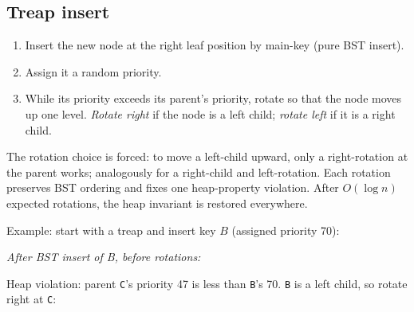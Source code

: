 \documentclass[11pt]{article}
\begin{document}
\subsection*{Treap insert}

\begin{enumerate}[leftmargin=*]
    \item Insert the new node at the right leaf position by main-key (pure BST insert).
    \item Assign it a random priority.
    \item While its priority exceeds its parent's priority, rotate so that the node moves up one level. \emph{Rotate right} if the node is a left child; \emph{rotate left} if it is a right child.
\end{enumerate}

The rotation choice is forced: to move a left-child upward, only a right-rotation at the parent works; analogously for a right-child and left-rotation. Each rotation preserves BST ordering and fixes one heap-property violation. After $O(\log n)$ expected rotations, the heap invariant is restored everywhere.

Example: start with a treap and insert key $B$ (assigned priority 70):

\begin{center}
\emph{After BST insert of B, before rotations:}
\end{center}

Heap violation: parent \texttt{C}'s priority 47 is less than \texttt{B}'s 70. \texttt{B} is a left child, so rotate right at \texttt{C}:

\begin{center}
\end{center}
\end{document}
